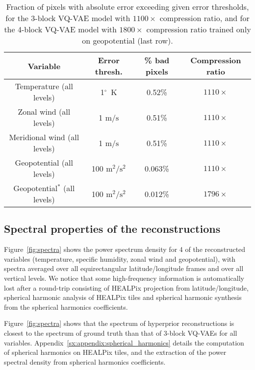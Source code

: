 \documentclass[11pt, a4paper, logo, copyright, numbering]{googledeepmind}
\begin{document}
\begin{table}[]
    \centering
    \caption{Fraction of pixels with absolute error exceeding given error thresholds, for the 3-block VQ-VAE model with $1100 \times$ compression ratio, and for the 4-block VQ-VAE model with $1800 \times$ compression ratio trained only on geopotential (last row).}
    \begin{tabular}{c|c|c|c}
        Variable & Error thresh. & \% bad pixels & Compression ratio \\
        \hline
Temperature (all levels) & 1$^\circ$~K & 0.52\% & $1110 \times$ \\
        Zonal wind (all levels) & 1 $\text{m}/\text{s}$ & 0.51\% & $1110 \times$ \\
        Meridional wind (all levels) & 1 $\text{m}/\text{s}$ & 0.51\% & $1110 \times$ \\
        Geopotential (all levels) & 100 $\text{m}^2/\text{s}^2$ & 0.063\% & $1110 \times$ \\
        \hline
        Geopotential$^*$ (all levels) & 100 $\text{m}^2/\text{s}^2$ & 0.012\% & $1796 \times$ \\
    \end{tabular}
    
    \label{tab:percent_bad_cells_vqvae}
\end{table}


\subsection{Spectral properties of the reconstructions}

Figure~\ref{fig:spectra} shows the power spectrum density for 4 of the reconstructed variables (temperature, specific humidity, zonal wind and geopotential), with spectra averaged over all equirectangular latitude/longitude frames and over all vertical levels. We notice that some high-frequency information is automatically lost after a round-trip consisting of HEALPix projection from latitude/longitude, spherical harmonic analysis of HEALPix tiles and spherical harmonic synthesis from the spherical harmonics coefficients.

Figure~\ref{fig:spectra} shows that the spectrum of hyperprior reconstructions is closest to the spectrum of ground truth than that of 3-block VQ-VAEs for all variables.
Appendix~\ref{sx:appendix:spherical_harmonics} details the computation of spherical harmonics on HEALPix tiles, and the extraction of the power spectral density from spherical harmonics coefficients.
\end{document}
